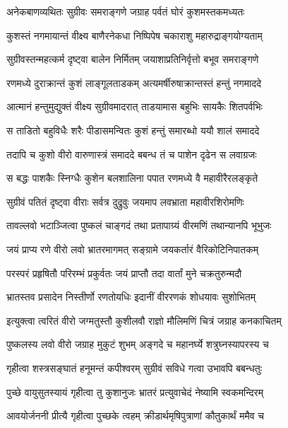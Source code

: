 \twolineshloka
{अनेकबाणव्यथितः सुग्रीवः समराङ्गणे}
{जग्राह पर्वतं घोरं कुशमस्तकमध्यतः}%

\twolineshloka
{कुशस्तं नगमायान्तं वीक्ष्य बाणैरनेकधा}
{निष्पिपेष चकाराशु महारुद्राङ्गयोग्यताम्}%

\twolineshloka
{सुग्रीवस्तन्महत्कर्म दृष्ट्वा बालेन निर्मितम्}
{जयाशाप्रतिनिर्वृत्तो बभूव समराङ्गणे}%

\twolineshloka
{रणमध्ये दुराक्रान्तं कुशं लाङ्गूलताडकम्}
{अत्यमर्षीरुषाक्रान्तस्तं हन्तुं नगमाददे}%

\twolineshloka
{आत्मानं हन्तुमुद्युक्तं वीक्ष्य सुग्रीवमादरात्}
{ताडयामास बहुभिः सायकैः शितपर्वभिः}%

\twolineshloka
{स ताडितो बहुविधैः शरैः पीडासमन्वितः}
{कुशं हन्तुं समारब्धो ययौ शालं समाददे}%

\twolineshloka
{तदापि च कुशो वीरो वारुणास्त्रं समाददे}
{बबन्ध तं च पाशेन दृढेन स लवाग्रजः}%

\twolineshloka
{स बद्धः पाशकैः स्निग्धैः कुशेन बलशालिना}
{पपात रणमध्ये वै महावीरैरलङ्कृते}%

\twolineshloka
{सुग्रीवं पतितं दृष्ट्वा वीराः सर्वत्र दुद्रुवुः}
{जयमाप लवभ्राता महावीरशिरोमणिः}%

\twolineshloka
{तावल्लवो भटाञ्जित्वा पुष्कलं चाङ्गदं तथा}
{प्रतापाग्र्यं वीरमणिं तथान्यानपि भूभुजः}%

\twolineshloka
{जयं प्राप्य रणे वीरो लवो भ्रातरमागमत्}
{सङ्ग्रामे जयकर्तारं वैरिकोटिनिपातकम्}%

\twolineshloka
{परस्परं प्रहृषितौ परिरम्भं प्रकुर्वतः}
{जयं प्राप्तौ तदा वार्तां मुने चक्रतुरुन्मदौ}%


\twolineshloka
{भ्रातस्तव प्रसादेन निस्तीर्णो रणतोयधिः}
{इदानीं वीररणकं शोधयावः सुशोभितम्}%

\twolineshloka
{इत्युक्त्वा त्वरितं वीरो जग्मतुस्तौ कुशीलवौ}
{राज्ञो मौलिमणिं चित्रं जग्राह कनकाचितम्}%

\twolineshloka
{पुष्कलस्य लवो वीरो जग्राह मुकुटं शुभम्}
{अङ्गदे च महानर्घ्ये शत्रुघ्नस्यापरस्य च}%

\twolineshloka
{गृहीत्वा शस्त्रसङ्घातं हनूमन्तं कपीश्वरम्}
{सुग्रीवं सविधे गत्वा उभावपि बबन्धतुः}%

\twolineshloka
{पुच्छे वायुसुतस्यायं गृहीत्वा तु कुशानुजः}
{भ्रातरं प्रत्युवाचेदं नेष्यामि स्वकमन्दिरम्}%

\twolineshloka
{आवयोर्जननी प्रीत्यै गृहीत्वा पुच्छके त्वहम्}
{क्रीडार्थमृषिपुत्राणां कौतुकार्थं ममैव च}%

